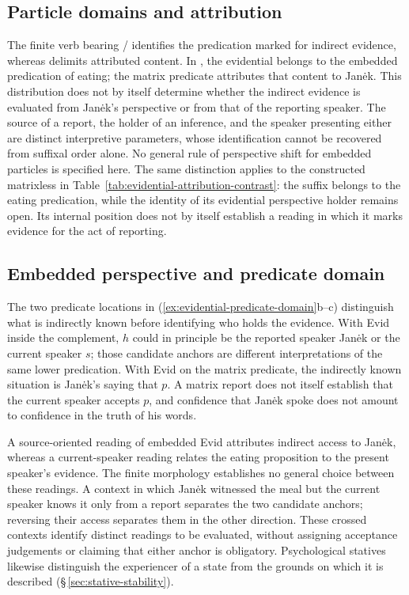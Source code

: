 \subsection{Particle domains and attribution}
\label{sec:particle-domains-attribution}

The finite verb bearing / identifies the predication
marked for indirect evidence, whereas  delimits attributed
content. In , the
evidential belongs to the embedded predication of eating; the matrix
predicate attributes that content to Janėk. This distribution does not by
itself determine whether the indirect evidence is evaluated from Janėk's
perspective or from that of the reporting speaker. The source of a report,
the holder of an inference, and the speaker presenting either are distinct
interpretive parameters, whose identification cannot be recovered from
suffixal order alone. No general rule of perspective shift for embedded
particles is specified here. The same distinction applies to the constructed
matrixless  in
Table~\ref{tab:evidential-attribution-contrast}: the suffix belongs to
the eating predication, while the identity of its evidential perspective
holder remains open. Its internal position does not by itself establish a
reading in which it marks evidence for the act of reporting.

\subsection{Embedded perspective and predicate domain}
\label{sec:evidential-embedded-perspective}

The two predicate locations in (\ref{ex:evidential-predicate-domain}b--c)
distinguish what is indirectly known before identifying who holds the
evidence. With Evid inside the complement, $h$ could in principle be the
reported speaker Janėk or the current speaker $s$; those candidate anchors
are different interpretations of the same lower predication. With Evid on
the matrix predicate, the indirectly known situation is Janėk's saying
that $p$. A matrix report does not itself establish that the current
speaker accepts $p$, and confidence that Janėk spoke does not amount to
confidence in the truth of his words.

A source-oriented reading of embedded Evid attributes indirect access to
Janėk, whereas a current-speaker reading relates the eating proposition to
the present speaker's evidence. The finite morphology establishes no
general choice between these readings. A context in which Janėk witnessed
the meal but the current speaker knows it only from a report separates the
two candidate anchors; reversing their access separates them in the other
direction. These crossed contexts identify distinct readings to be
evaluated, without assigning acceptance judgements or claiming that either
anchor is obligatory. Psychological statives likewise distinguish the
experiencer of a state from the grounds on which it is described
(§\,\ref{sec:stative-stability}).

